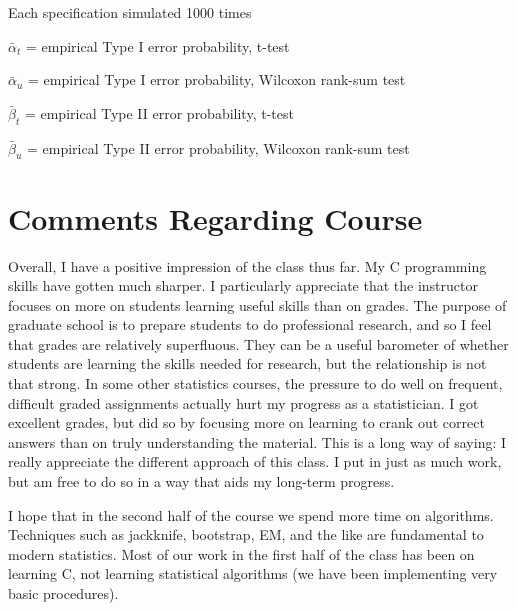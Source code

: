 \documentclass{report}
\begin{document}
\begin{table}[h]
\begin{threeparttable}
\begin{tabular}{|l r r r r r r r r r r r|}
		\hline
	\end{tabular}
		\begin{tablenotes}
		\item Each specification simulated 1000 times
		\item $\bar{\alpha}_t$ = empirical Type I error probability, t-test
		\item $\bar{\alpha}_u$ = empirical Type I error probability,
			Wilcoxon rank-sum test
		\item $\bar{\beta}_t$ = empirical Type II error probability, t-test
		\item $\bar{\beta}_u$ = empirical Type II error probability, Wilcoxon rank-sum test
		\end{tablenotes}
	\end{threeparttable}
\end{table}

\section*{Comments Regarding Course}

Overall, I have a positive impression of the class thus far. My C programming
skills have gotten much sharper. I particularly appreciate that the instructor
focuses on more on students learning useful skills than on grades. The purpose of
graduate school is to prepare students to do professional research, and so 
I feel that grades are relatively superfluous. They can be a useful
barometer of whether students are learning the skills needed for research, but the
relationship is not that strong. In some other statistics courses, the pressure 
to do well on frequent, difficult graded assignments actually hurt my
progress as a statistician. I got excellent grades, but did so by focusing more on 
learning to crank out correct answers than on truly understanding the material.
This is a long way of saying: I really appreciate the different approach of this
class. I put in just as much work, but am free to do so in a way that aids my
long-term progress. 

I hope that in the second half of the course we spend more time on algorithms.
Techniques such as jackknife, bootstrap, EM, and the like are fundamental to
modern statistics. Most of our work in the first half of the class has been on
learning C, not learning statistical algorithms (we have been implementing very
basic procedures). 
\end{document}
